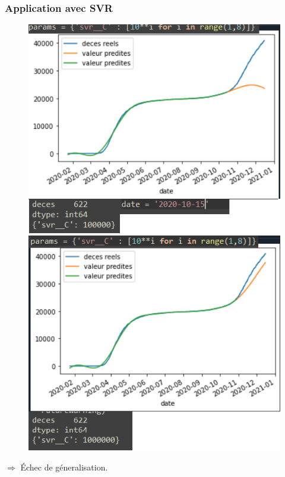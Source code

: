 \documentclass{beamer}
\begin{document}
\begin{frame}
	\frametitle{Application avec SVR}
	\begin{figure}[t]
		\centering
		\begin{minipage}{0.5\textwidth}
			\includegraphics[scale=0.32]{SVR_avant_pt_dinflexion}
		\end{minipage}%
		\begin{minipage}{0.5\textwidth}
			\includegraphics[scale=0.32]{SVR_apres_pt_dinflexion}
		\end{minipage}
	\end{figure}
	$\Rightarrow$ \'Echec de géneralisation.
\end{frame}
\end{document}

